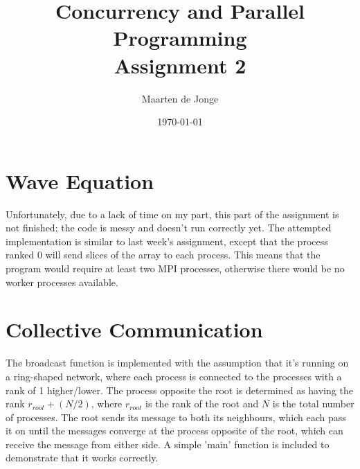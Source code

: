 \documentclass[a4paper]{article}
\author{Maarten de Jonge}
\date{\today}
\title{Concurrency and Parallel Programming \\
\large{Assignment 2}}
\begin{document}
\maketitle

\section*{Wave Equation}
Unfortunately, due to a lack of time on my part, this part of the assignment is
not finished; the code is messy and doesn't run correctly yet. The attempted
implementation is similar to last week's assignment, except that the process
ranked 0 will send slices of the array to each process. This means that the
program would require at least two MPI processes, otherwise there would be no
worker processes available.

\section*{Collective Communication}
The broadcast function is implemented with the assumption that it's running on a
ring-shaped network, where each process is connected to the processes with a
rank of 1 higher/lower. The process opposite the root is determined as having
the rank $r_{root} + (N / 2)$, where $r_{root}$ is the rank of the root and $N$
is the total number of processes. The root sends its message to both its
neighbours, which each pass it on until the messages converge at the process
opposite of the root, which can receive the message from either side. A simple
'main' function is included to demonstrate that it works correctly.
\end{document}
